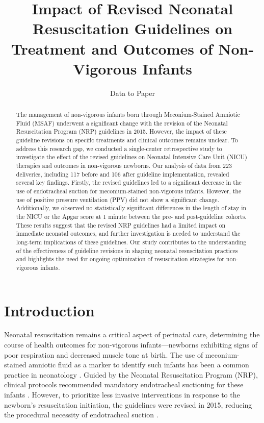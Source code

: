 \documentclass[11pt]{article}
\title{Impact of Revised Neonatal Resuscitation Guidelines on Treatment and Outcomes of Non-Vigorous Infants}
\author{Data to Paper}
\begin{document}
\maketitle
\begin{abstract}The management of non-vigorous infants born through Meconium-Stained Amniotic Fluid (MSAF) underwent a significant change with the revision of the Neonatal Resuscitation Program (NRP) guidelines in 2015. However, the impact of these guideline revisions on specific treatments and clinical outcomes remains unclear. To address this research gap, we conducted a single-center retrospective study to investigate the effect of the revised guidelines on Neonatal Intensive Care Unit (NICU) therapies and outcomes in non-vigorous newborns. Our analysis of data from 223 deliveries, including 117 before and 106 after guideline implementation, revealed several key findings. Firstly, the revised guidelines led to a significant decrease in the use of endotracheal suction for meconium-stained non-vigorous infants. However, the use of positive pressure ventilation (PPV) did not show a significant change. Additionally, we observed no statistically significant differences in the length of stay in the NICU or the Apgar score at 1 minute between the pre- and post-guideline cohorts. These results suggest that the revised NRP guidelines had a limited impact on immediate neonatal outcomes, and further investigation is needed to understand the long-term implications of these guidelines. Our study contributes to the understanding of the effectiveness of guideline revisions in shaping neonatal resuscitation practices and highlights the need for ongoing optimization of resuscitation strategies for non-vigorous infants.\end{abstract}
\section*{Introduction}

Neonatal resuscitation remains a critical aspect of perinatal care, determining the course of health outcomes for non-vigorous infants—newborns exhibiting signs of poor respiration and decreased muscle tone at birth. The use of meconium-stained amniotic fluid as a marker to identify such infants has been a common practice in neonatology \cite{Sori2016MeconiumSA}. Guided by the Neonatal Resuscitation Program (NRP), clinical protocols recommended mandatory endotracheal suctioning for these infants \cite{ Thomas2010TeamTI}. However, to prioritize less invasive interventions in response to the newborn's resuscitation initiation, the guidelines were revised in 2015, reducing the procedural necessity of endotracheal suction \cite{Singhal2012HelpingBB}.
\end{document}
